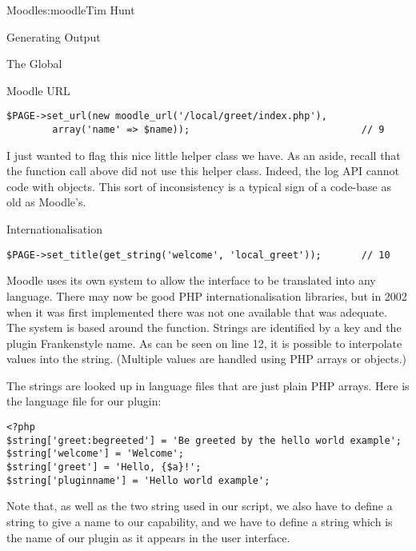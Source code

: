 \begin{aosachapter}{Moodle}{s:moodle}{Tim Hunt}
\begin{aosasect1}{Generating Output}
\begin{aosasect2}{The  Global}
\end{aosasect2}

\begin{aosasect2}{Moodle URL}

\begin{verbatim}
$PAGE->set_url(new moodle_url('/local/greet/index.php'),
        array('name' => $name));                              // 9
\end{verbatim}

I just wanted to flag this nice little helper class we have. As an
aside, recall that the  function call above did not
use this helper class. Indeed, the log API cannot code with
 objects. This sort of inconsistency is a typical
sign of a code-base as old as Moodle's.

\end{aosasect2}

\begin{aosasect2}{Internationalisation}

\begin{verbatim}
$PAGE->set_title(get_string('welcome', 'local_greet'));       // 10
\end{verbatim}

Moodle uses its own system to allow the interface to be translated
into any language. There may now be good PHP internationalisation
libraries, but in 2002 when it was first implemented there was not one
available that was adequate. The system is based around the
 function. Strings are identified by a key and the
plugin Frankenstyle name. As can be seen on line 12, it is possible to
interpolate values into the string. (Multiple values are handled using
PHP arrays or objects.)

The strings are looked up in language files that are just plain PHP
arrays. Here is the language file
 for our plugin:

\begin{verbatim}
<?php
$string['greet:begreeted'] = 'Be greeted by the hello world example';
$string['welcome'] = 'Welcome';
$string['greet'] = 'Hello, {$a}!';
$string['pluginname'] = 'Hello world example';
\end{verbatim}

Note that, as well as the two string used in our script, we also have
to define a string to give a name to our capability, and we have to
define a string  which is the name of our plugin as
it appears in the user interface.


\end{aosasect2}
\end{aosasect1}
\end{aosachapter}
